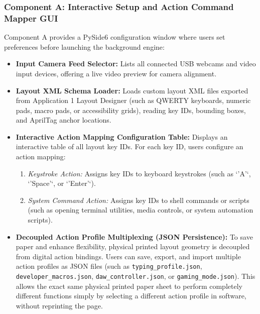 \subsubsection{Component A: Interactive Setup and Action Command Mapper GUI}
Component A provides a PySide6 configuration window where users set preferences before launching the background engine:
\begin{itemize}
    \item \textbf{Input Camera Feed Selector:} Lists all connected USB webcams and video input devices, offering a live video preview for camera alignment.
    \item \textbf{Layout XML Schema Loader:} Loads custom layout XML files exported from Application 1 Layout Designer (such as QWERTY keyboards, numeric pads, macro pads, or accessibility grids), reading key IDs, bounding boxes, and AprilTag anchor locations.
    \item \textbf{Interactive Action Mapping Configuration Table:} Displays an interactive table of all layout key IDs. For each key ID, users configure an action mapping:
    \begin{enumerate}
        \item \emph{Keystroke Action:} Assigns key IDs to keyboard keystrokes (such as `'A'`, `'Space'`, or `'Enter'`).
        \item \emph{System Command Action:} Assigns key IDs to shell commands or scripts (such as opening terminal utilities, media controls, or system automation scripts).
    \end{enumerate}
    \item \textbf{Decoupled Action Profile Multiplexing (JSON Persistence):} To save paper and enhance flexibility, physical printed layout geometry is decoupled from digital action bindings. Users can save, export, and import multiple action profiles as JSON files (such as \texttt{typing\_profile.json}, \texttt{developer\_macros.json}, \texttt{daw\_controller.json}, or \texttt{gaming\_mode.json}). This allows the exact same physical printed paper sheet to perform completely different functions simply by selecting a different action profile in software, without reprinting the page.
\end{itemize}

